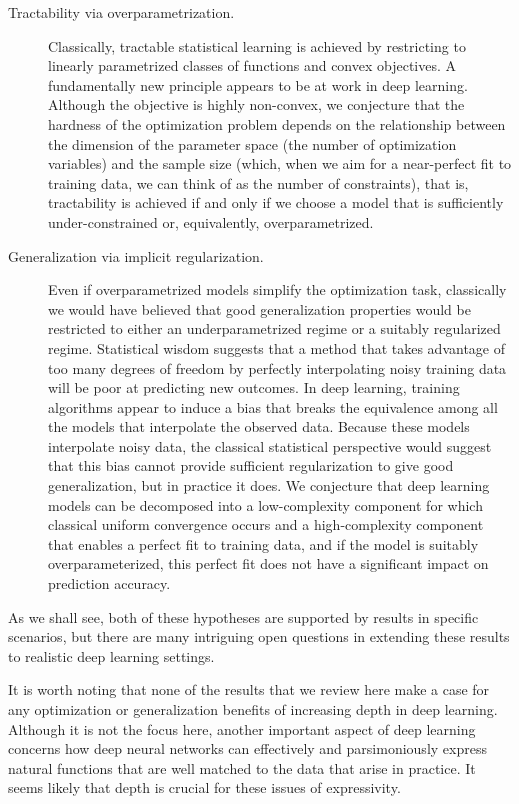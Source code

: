 \begin{description}
\item[Tractability via overparametrization.] Classically, tractable statistical learning is achieved by restricting to linearly parametrized classes of functions and convex objectives. A fundamentally new principle appears to be at work in deep learning. Although the objective is highly non-convex, we conjecture that the hardness of the optimization problem depends on the relationship between the dimension of the parameter space (the number of optimization variables) and the sample size (which, when we aim for a near-perfect fit to training data, we can think of as the number of constraints), that is, tractability is achieved if and only if we choose a model that is sufficiently under-constrained or, equivalently, overparametrized.

\item[Generalization via implicit regularization.]  Even if overparametrized models simplify the optimization task, classically we would have believed that good generalization properties would be restricted to either an underparametrized regime or a suitably regularized regime. Statistical wisdom suggests that a method that takes advantage of too many degrees of freedom by perfectly interpolating noisy training data will be poor at predicting new outcomes. In deep learning, training algorithms appear to induce a bias that breaks the equivalence among all the models that interpolate the observed data.  Because these models interpolate noisy data, the classical statistical perspective would suggest that this bias cannot provide sufficient regularization to give good generalization, but in practice it does. We conjecture that deep learning models can be decomposed into a low-complexity component for which classical uniform convergence occurs and a high-complexity component that enables a perfect fit to training data, and if the model is suitably overparameterized, this perfect fit does not have a significant impact on prediction accuracy.
\end{description}

As we shall see, both of these hypotheses are supported by results in specific scenarios, but there are many intriguing open questions in extending these results to realistic deep learning settings.

It is worth noting that none of the results that we review here make a case for any optimization or generalization benefits of increasing depth in deep learning.  Although it is not the focus here, another important aspect of deep learning concerns how deep neural networks can effectively and parsimoniously express natural functions that are well matched to the data that arise in practice. It seems likely that depth is crucial for these issues of expressivity.

